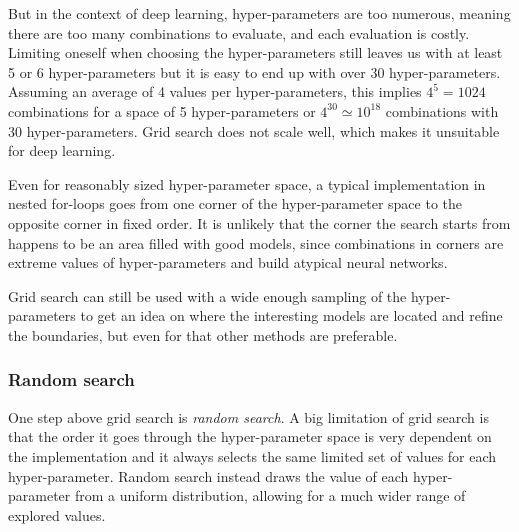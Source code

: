 But in the context of deep learning, hyper-parameters are too numerous, meaning there are too many combinations to evaluate, and each evaluation is costly. Limiting oneself when choosing the hyper-parameters still leaves us with at least 5 or 6 hyper-parameters but it is easy to end up with over 30 hyper-parameters. Assuming an average of 4 values per hyper-parameters, this implies $4^5 = 1024$ combinations for a space of 5 hyper-parameters or $4^{30} \simeq 10^{18}$ combinations with 30 hyper-parameters. Grid search does not scale well, which makes it unsuitable for deep learning.

Even for reasonably sized hyper-parameter space, a typical implementation in nested for-loops goes from one corner of the hyper-parameter space to the opposite corner in fixed order. It is unlikely that the corner the search starts from happens to be an area filled with good models, since combinations in corners are extreme values of hyper-parameters and build atypical neural networks. 

Grid search can still be used with a wide enough sampling of the hyper-parameters to get an idea on where the interesting models are located and refine the boundaries, but even for that other methods are preferable.

\subsubsection{Random search}

One step above grid search is \textit{random search}. A big limitation of grid search is that the order it goes through the hyper-parameter space is very dependent on the implementation and it always selects the same limited set of values for each hyper-parameter. Random search instead draws the value of each hyper-parameter from a uniform distribution, allowing for a much wider range of explored values.

